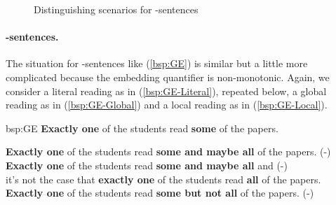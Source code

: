 \documentclass[fleqn,reqno,10pt,draft]{article}
\newcommand{\lit}{\acro{lit}}
\newcommand{\glb}{\acro{glb}}
\newcommand{\loc}{\acro{loc}}
\newcommand{\as}{\acro{as}}
\renewcommand{\es}{\acro{es}}
\renewcommand{\mymark}[1]{\textbf{#1}}
\begin{document}
\begin{figure}[t]
{



}

  \caption{Distinguishing scenarios for \as-sentences}
  \label{fig:AS-distinguishing-pics}
\end{figure}


\paragraph{\es-sentences.}

The situation for \es-sentences like (\ref{bsp:GE}) is similar but a
little more complicated because the embedding quantifier is
non-monotonic. Again, we consider a literal reading as in
(\ref{bsp:GE-Literal}), repeated below, a global reading as in
(\ref{bsp:GE-Global}) and a local reading as in (\ref{bsp:GE-Local}).

\begin{exer}{bsp:GE}
\ex \mymark{Exactly one} of the students read {\mymark{some}} of the
  papers.

  \begin{xlist}
  \ex \mymark{Exactly one} of the students read
    {\mymark{some and maybe all}} of the papers. \hfill (\es-\lit)
  \ex 
    \mymark{Exactly one} of the students read \mymark{some and maybe all} 
    and  \hfill (\es-\glb)\\
    it's not the case that \mymark{exactly one} of the students read \mymark{all} of the papers.
  \ex 
    \mymark{Exactly one} of the students read {\mymark{some  but not all}} of the
    papers. \hfill (\es-\loc)
  \end{xlist}
\end{exer}
\end{document}
